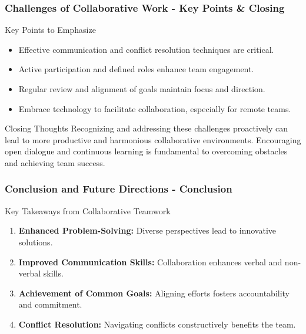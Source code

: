 \documentclass[aspectratio=169]{beamer}
\begin{document}
\begin{frame}[fragile]
  \frametitle{Challenges of Collaborative Work - Key Points & Closing}
  \begin{block}{Key Points to Emphasize}
    \begin{itemize}
      \item Effective communication and conflict resolution techniques are critical.
      \item Active participation and defined roles enhance team engagement.
      \item Regular review and alignment of goals maintain focus and direction.
      \item Embrace technology to facilitate collaboration, especially for remote teams.
    \end{itemize}
  \end{block}

  \begin{block}{Closing Thoughts}
    Recognizing and addressing these challenges proactively can lead to more productive and harmonious collaborative environments. Encouraging open dialogue and continuous learning is fundamental to overcoming obstacles and achieving team success.
  \end{block}
\end{frame}

\begin{frame}[fragile]
    \frametitle{Conclusion and Future Directions - Conclusion}
    \begin{block}{Key Takeaways from Collaborative Teamwork}
        \begin{enumerate}
            \item \textbf{Enhanced Problem-Solving:} Diverse perspectives lead to innovative solutions. 
            \item \textbf{Improved Communication Skills:} Collaboration enhances verbal and non-verbal skills.
            \item \textbf{Achievement of Common Goals:} Aligning efforts fosters accountability and commitment.
            \item \textbf{Conflict Resolution:} Navigating conflicts constructively benefits the team.
        \end{enumerate}
    \end{block}
\end{frame}
\end{document}
